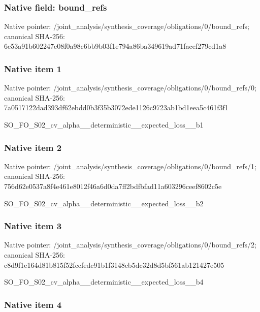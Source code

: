 \documentclass[10pt,a4paper]{article}
\begin{document}
\subsubsection{Native field: bound\_refs}


Native pointer: /joint\_analysis/synthesi\allowbreak{}s\_coverage/obligations/0\allowbreak{}/bound\_refs; canonical SHA-256: 6e53a91b602247e08f0a98c6\allowbreak{}bb9b03f1e794a86ba349619a\allowbreak{}d71facef279cd1a8



\subsubsection{Native item 1}


Native pointer: /joint\_analysis/synthesi\allowbreak{}s\_coverage/obligations/0\allowbreak{}/bound\_refs/0; canonical SHA-256: 7a0517122dad393df62ebdd0\allowbreak{}b3f35b3072ede1126c9723ab\allowbreak{}1bd1eea5c461f3f1


SO\_FO\_S02\_cv\_alpha\_\_dete\allowbreak{}rministic\_\_expected\_loss\allowbreak{}\_\_b1


\subsubsection{Native item 2}


Native pointer: /joint\_analysis/synthesi\allowbreak{}s\_coverage/obligations/0\allowbreak{}/bound\_refs/1; canonical SHA-256: 756d62e0537a8f4e461e8012\allowbreak{}f46a6d0da7ff2bdfbfad11a6\allowbreak{}03296ceef8602c5e


SO\_FO\_S02\_cv\_alpha\_\_dete\allowbreak{}rministic\_\_expected\_loss\allowbreak{}\_\_b2


\subsubsection{Native item 3}


Native pointer: /joint\_analysis/synthesi\allowbreak{}s\_coverage/obligations/0\allowbreak{}/bound\_refs/2; canonical SHA-256: c8d9f1e164d81b815f52fccf\allowbreak{}edc91b1f3148cb5dc32d8d5b\allowbreak{}f561ab121427e505


SO\_FO\_S02\_cv\_alpha\_\_dete\allowbreak{}rministic\_\_expected\_loss\allowbreak{}\_\_b4


\subsubsection{Native item 4}
\end{document}
